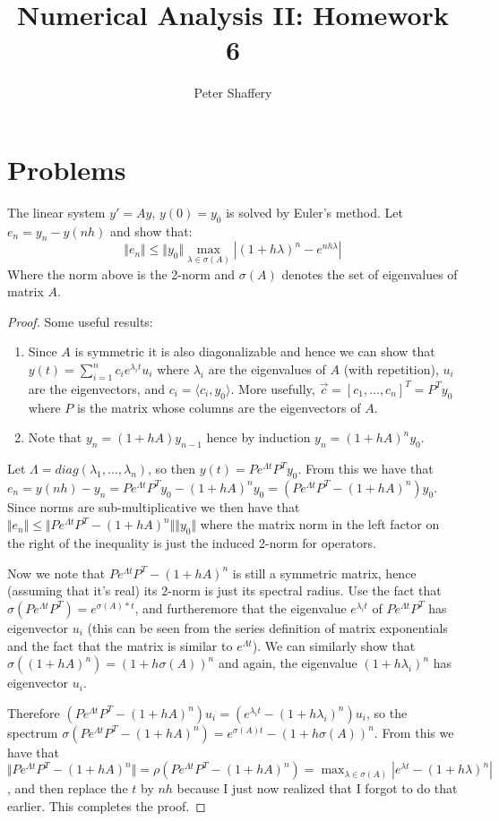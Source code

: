 \documentclass[10pt,a4paper]{article}
\newenvironment{problem}[2][Problem]{\begin{trivlist}
\item[\hskip \labelsep {\bfseries #1}\hskip \labelsep {\bfseries #2.}]}{\end{trivlist}}
\begin{document}
\author{Peter Shaffery}
\title{Numerical Analysis II: Homework 6}
\maketitle
\section{Problems}
\begin{problem}{1}
The linear system $y' = A y$, $y(0) = y_0$ is solved by Euler's method.  Let $e_n = y_n - y(nh)$ and show that:
\[
\Vert e_n \Vert \leq \Vert y_0 \Vert \max_{\lambda \in \sigma(A)} | (1 + h \lambda)^n  - e^{nh\lambda}|
\]
Where the norm above is the 2-norm and $\sigma(A)$ denotes the set of eigenvalues of matrix $A$.
\end{problem}
\begin{proof}
Some useful results:
\begin{enumerate}
\item Since $A$ is symmetric it is also diagonalizable and hence we can show that $y(t) = \sum\limits_{i=1}^n c_i e^{\lambda_i t} u_i$ where $\lambda_i$ are the eigenvalues of $A$ (with repetition), $u_i$ are the eigenvectors, and $c_i = \langle c_i,y_0 \rangle$.  More usefully, $\vec{c} = [c_1,...,c_n]^T = P^T y_0$ where $P$ is the matrix whose columns are the eigenvectors of $A$.
\item Note that $y_n = (1 + hA) y_{n-1}$ hence by induction $y_n = (1+hA)^n y_0$.
\end{enumerate}
Let $\Lambda = diag(\lambda_1,...,\lambda_n)$, so then $y(t) = P e^{\Lambda t} P^T y_0$.  From this we have that $e_n = y(nh) - y_n = P e^{\Lambda t}  P^T y_0 - (1+hA)^n y_0 = (P e^{\Lambda t} P^T - (1+hA)^n) y_0$. Since norms are sub-multiplicative we then have that $\Vert e_n \Vert \leq \Vert P e^{\Lambda t} P^T - (1+hA)^n \Vert \Vert y_0 \Vert$ where the matrix norm in the left factor on the right of the inequality is just the induced 2-norm for operators.

Now we note that $P e^{\Lambda t} P^T - (1+hA)^n$ is still a symmetric matrix, hence (assuming that it's real) its 2-norm is just its spectral radius.  Use the fact that $\sigma(P e^{\Lambda t} P^T) = e^{\sigma(A)*t}$, and furtheremore that the eigenvalue $e^{\lambda_it }$ of $P e^{\Lambda t} P^T$ has eigenvector $u_i$ (this can be seen from the series definition of matrix exponentials and the fact that the matrix is similar to $e^{\Lambda t}$).  We can similarly show that $\sigma((1+hA)^n) = (1 + h \sigma(A))^n$ and again, the eigenvalue $(1+h \lambda_i)^n$ has eigenvector $u_i$.  

Therefore $(P e^{\Lambda t} P^T - (1+hA)^n) u_i = (e^{\lambda_i t} - (1+h \lambda_i)^n) u_i$, so the spectrum $\sigma(P e^{\Lambda t} P^T - (1+hA)^n) = e^{\sigma(A) t} - (1+h \sigma(A))^n$.  From this we have that $\Vert P e^{\Lambda t} P^T - (1+hA)^n \Vert = \rho(P e^{\Lambda t} P^T - (1+hA)^n) = \max_{\lambda \in \sigma(A)} |e^{\lambda t} - (1+h \lambda)^n|$, and then replace the $t$ by $nh$ because I just now realized that I forgot to do that earlier.  This completes the proof.
\end{proof}
\end{document}
